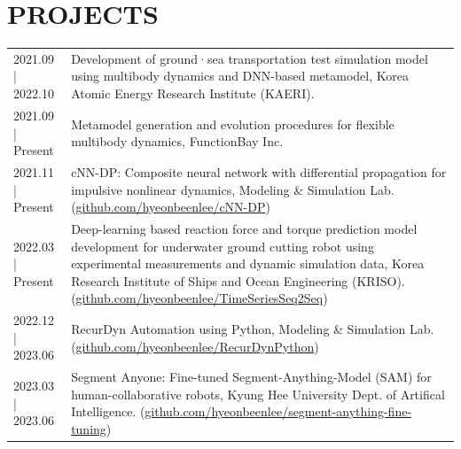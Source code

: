 \documentclass[a4paper,10pt]{extarticle}
\begin{document}
\section*{PROJECTS}
\noindent
{}
\vspace*{-.5cm}
\begin{longtable}{LR}
    {2021.09 | 2022.10} & Development of ground·sea transportation test simulation model using multibody dynamics and DNN-based metamodel, Korea Atomic Energy Research Institute (KAERI).                                                                                                                                                                                   \\
    {2021.09 | Present} & Metamodel generation and evolution procedures for flexible multibody dynamics, FunctionBay Inc.                                                                                                                                                                                                                                                    \\
    {2021.11 | Present} & cNN-DP: Composite neural network with differential propagation for impulsive nonlinear dynamics, Modeling \& Simulation Lab. (\href{https://github.com/hyeonbeenlee/cNN-DP}{github.com/hyeonbeenlee/cNN-DP})                                                                                                                                       \\
    {2022.03 | Present} & Deep-learning based reaction force and torque prediction model development for underwater ground cutting robot using experimental measurements and dynamic simulation data, Korea Research Institute of Ships and Ocean Engineering (KRISO). (\href{https://github.com/hyeonbeenlee/TimeSeriesSeq2Seq}{github.com/hyeonbeenlee/TimeSeriesSeq2Seq}) \\
    {2022.12 | 2023.06} & RecurDyn Automation using Python, Modeling \& Simulation Lab. (\href{https://github.com/hyeonbeenlee/RecurDynPython}{github.com/hyeonbeenlee/RecurDynPython})                                                                                                                                                                                      \\
    {2023.03 | 2023.06} & Segment Anyone: Fine-tuned Segment-Anything-Model (SAM) for human-collaborative robots, Kyung Hee University Dept. of Artifical Intelligence. (\href{https://github.com/hyeonbeenlee/segment-anything-fine-tuning}{github.com/hyeonbeenlee/segment-anything-fine-tuning})                                                                          \\
\end{longtable}
\end{document}
